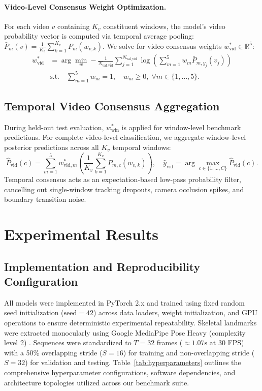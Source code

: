 \documentclass[preprint,12pt]{elsarticle}
\begin{document}
\paragraph{Video-Level Consensus Weight Optimization.} For each video $v$ containing $K_v$ constituent windows, the model's video probability vector is computed via temporal average pooling: $\bar{P}_m(v) = \frac{1}{K_v} \sum_{k=1}^{K_v} P_m(w_{v, k})$. We solve for video consensus weights $w_{\text{vid}}^* \in \mathbb{R}^5$:
\begin{equation}
\begin{aligned}
    w_{\text{vid}}^* &= \arg\min_{w} -\frac{1}{N_{\text{val\_vid}}} \sum_{j=1}^{N_{\text{val\_vid}}} \log \left( \sum_{m=1}^5 w_m \bar{P}_{m, y_j}(v_j) \right) \\
    &\text{s.t.} \quad \sum_{m=1}^5 w_m = 1, \quad w_m \ge 0, \; \forall m \in \{1, \dots, 5\}.
\end{aligned}
\end{equation}

\subsection{Temporal Video Consensus Aggregation}
During held-out test evaluation, $w_{\text{win}}^*$ is applied for window-level benchmark predictions. For complete video-level classification, we aggregate window-level posterior predictions across all $K_v$ temporal windows:
\begin{equation}
    \hat{P}_{\text{vid}}(c) = \sum_{m=1}^5 w_{\text{vid}, m}^* \left( \frac{1}{K_v} \sum_{k=1}^{K_v} P_{m, c}(w_{v, k}) \right), \quad \hat{y}_{\text{vid}} = \arg\max_{c \in \{1, \dots, C\}} \hat{P}_{\text{vid}}(c).
\end{equation}
Temporal consensus acts as an expectation-based low-pass probability filter, cancelling out single-window tracking dropouts, camera occlusion spikes, and boundary transition noise.

\section{Experimental Results}

\subsection{Implementation and Reproducibility Configuration}
All models were implemented in PyTorch 2.x \cite{paszke2019} and trained using fixed random seed initialization ($\text{seed} = 42$) across data loaders, weight initialization, and GPU operations to ensure deterministic experimental repeatability. Skeletal landmarks were extracted monocularly using Google MediaPipe Pose Heavy (complexity level 2) \cite{chuankun2019,bazarevsky2020}. Sequences were standardized to $T=32$ frames ($\approx 1.07\text{s}$ at 30 FPS) with a 50\% overlapping stride ($S=16$) for training and non-overlapping stride ($S=32$) for validation and testing. Table~\ref{tab:hyperparameters} outlines the comprehensive hyperparameter configurations, software dependencies, and architecture topologies utilized across our benchmark suite.
\end{document}

